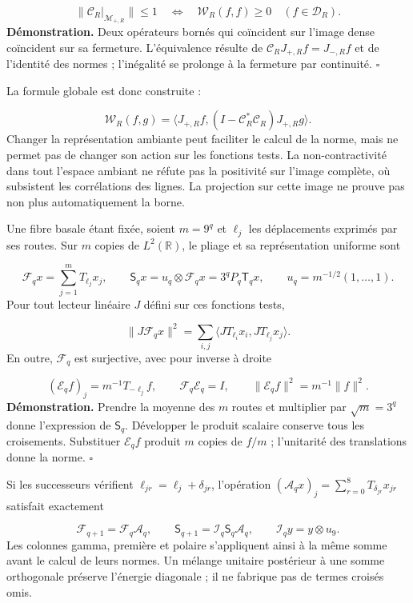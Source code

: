 \[
\|\mathcal C_R|_{\mathcal M_{+,R}}\|\leq1
\quad\Longleftrightarrow\quad
\mathscr W_R(f,f)\geq0\quad(f\in\mathcal D_R).
\]
\textbf{Démonstration.} Deux opérateurs bornés qui coïncident sur l’image dense coïncident sur sa fermeture. L’équivalence résulte de \(\mathcal C_RJ_{+,R}f=J_{-,R}f\) et de l’identité des normes ; l’inégalité se prolonge à la fermeture par continuité. \hfill\(\square\)

La formule globale est donc construite :

\[
\mathscr W_R(f,g)=
\langle J_{+,R}f,(I-\mathcal C_R^*\mathcal C_R)J_{+,R}g\rangle.
\]
Changer la représentation ambiante peut faciliter le calcul de la norme, mais ne permet pas de changer son action sur les fonctions tests. La non-contractivité dans tout l’espace ambiant ne réfute pas la positivité sur l’image complète, où subsistent les corrélations des lignes. La projection sur cette image ne prouve pas non plus automatiquement la borne.

Une fibre basale étant fixée, soient \(m=9^q\) et \(\ell_j\) les déplacements exprimés par ses routes. Sur \(m\) copies de \(L^2(\mathbb R)\), le pliage et sa représentation uniforme sont

\[
\mathcal F_qx=\sum_{j=1}^mT_{\ell_j}x_j,\qquad
\mathsf S_qx=u_q\otimes\mathcal F_qx=3^qP_q\mathsf T_qx,
\qquad u_q=m^{-1/2}(1,\ldots,1).
\]
Pour tout lecteur linéaire \(J\) défini sur ces fonctions tests,

\[
\|J\mathcal F_qx\|^2
=\sum_{i,j}\langle JT_{\ell_i}x_i,JT_{\ell_j}x_j\rangle.
\]
En outre, \(\mathcal F_q\) est surjective, avec pour inverse à droite

\[
(\mathcal E_qf)_j=m^{-1}T_{-\ell_j}f,\qquad
\mathcal F_q\mathcal E_q=I,\qquad
\|\mathcal E_qf\|^2=m^{-1}\|f\|^2.
\]
\textbf{Démonstration.} Prendre la moyenne des \(m\) routes et multiplier par \(\sqrt m=3^q\) donne l’expression de \(\mathsf S_q\). Développer le produit scalaire conserve tous les croisements. Substituer \(\mathcal E_qf\) produit \(m\) copies de \(f/m\) ; l’unitarité des translations donne la norme. \hfill\(\square\)

Si les successeurs vérifient \(\ell_{jr}=\ell_j+\delta_{jr}\), l'opération \((\mathcal A_qx)_j=\sum_{r=0}^8T_{\delta_{jr}}x_{jr}\) satisfait exactement

\[
\mathcal F_{q+1}=\mathcal F_q\mathcal A_q,\qquad
\mathsf S_{q+1}=\mathcal I_q\mathsf S_q\mathcal A_q,\qquad
\mathcal I_qy=y\otimes u_9.
\]
Les colonnes gamma, première et polaire s'appliquent ainsi à la même somme avant le calcul de leurs normes. Un mélange unitaire postérieur à une somme orthogonale préserve l'énergie diagonale ; il ne fabrique pas de termes croisés omis.

